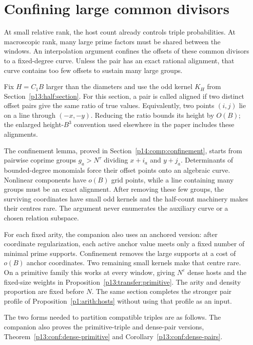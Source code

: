 \section{Confining large common divisors}
\label{p13:conf:section}

At small relative rank, the host count already controls
triple probabilities. At macroscopic rank, many large
prime factors must be shared between the windows.
An interpolation argument confines the offsets of these
common divisors to a fixed-degree curve. Unless the pair
has an exact rational alignment, that curve contains too
few offsets to sustain many large groups.

Fix \(H=C_1B\) larger than the diameters and use the odd
kernel \(K_H\) from Section~\ref{p13:half:section}.
For this section, a pair is called aligned if two distinct
offset pairs give the same ratio of true values.
Equivalently, two points \((i,j)\) lie on a line through
\((-x,-y)\). Reducing the ratio bounds its height by
\(O(B)\); the enlarged height-\(B^3\) convention used
elsewhere in the paper includes these alignments.


The confinement lemma, proved in Section~\ref{p14:comp:confinement},
starts from pairwise coprime groups $g_a>N^\tau$ dividing
$x+i_a$ and $y+j_a$.  Determinants of bounded-degree monomials force
their offset points onto an algebraic curve.  Nonlinear components
have $o(B)$ grid points, while a line containing many groups must be
an exact alignment.  After removing these few groups, the surviving
coordinates have small odd kernels and the half-count machinery makes
their centres rare.  The argument never enumerates the auxiliary curve
or a chosen relation subspace.

For each fixed arity, the companion also uses an anchored version:
after coordinate regularization, each active anchor value meets only
a fixed number of minimal prime supports. Confinement removes the
large supports at a cost of $o(B)$ anchor coordinates. Two remaining
small kernels make that centre rare. On a primitive family this
works at every window, giving $N^\varepsilon$ dense hosts and the
fixed-size weights in Proposition~\ref{p13:transfer:primitive}.
The arity and density proportion are fixed before $N$.
The same section completes the stronger pair profile of
Proposition~\ref{p1:arith:hosts} without using that profile as an input.

The two forms needed to partition compatible triples are as follows.
The companion also proves the primitive-triple and dense-pair versions,
Theorem~\ref{p13:conf:dense-primitive} and
Corollary~\ref{p13:conf:dense-pairs}.

